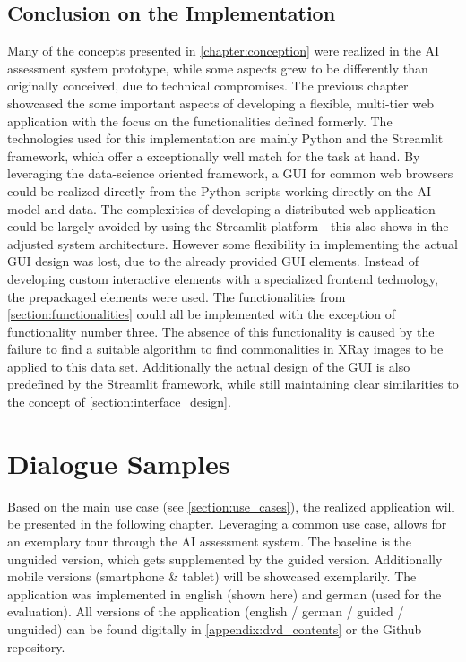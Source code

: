 \documentclass[11pt,a4paper,english]{scrreprt}
\begin{document}
\section{Conclusion on the Implementation}
Many of the concepts presented in \autoref{chapter:conception} were realized in the AI assessment system prototype, while some aspects grew to be differently than originally conceived, due to technical compromises. The previous chapter showcased the some important aspects of developing a flexible, multi-tier web application with the focus on the functionalities defined formerly. The technologies used for this implementation are mainly Python and the Streamlit framework, which offer a exceptionally well match for the task at hand. By leveraging the data-science oriented framework, a GUI for common web browsers could be realized directly from the Python scripts working directly on the AI model and data. The complexities of developing a distributed web application could be largely avoided by using the Streamlit platform - this also shows in the adjusted system architecture. However some flexibility in implementing the actual GUI design was lost, due to the already provided GUI elements. Instead of developing custom interactive elements with a specialized frontend technology, the prepackaged elements were used. The functionalities from \autoref{section:functionalities} could all be implemented with the exception of functionality number three. The absence of this functionality is caused by the failure to find a suitable algorithm to find commonalities in XRay images to be applied to this data set. Additionally the actual design of the GUI is also predefined by the Streamlit framework, while still maintaining clear similarities to the concept of \autoref{section:interface_design}.

\newpage
\chapter{Dialogue Samples}\label{chapter:dialogue_samples}
Based on the main use case (see \autoref{section:use_cases}), the realized application will be presented in the following chapter. Leveraging a common use case, allows for an exemplary tour through the AI assessment system. The baseline is the unguided version, which gets supplemented by the guided version. Additionally mobile versions (smartphone \& tablet) will be showcased exemplarily. The application was implemented in english (shown here) and german (used for the evaluation). All versions of the application (english / german / guided / unguided) can be found digitally in \autoref{appendix:dvd_contents} or the Github repository.
\end{document}
